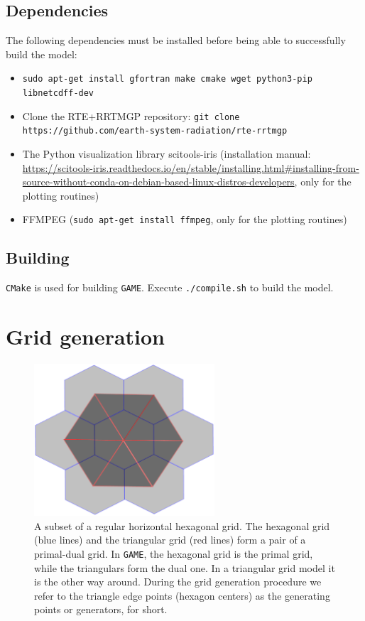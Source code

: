 \documentclass[10pt]{report}
\begin{document}
\section{Dependencies}
\label{sec:dependencies}

The following dependencies must be installed before being able to successfully build the model:

\begin{itemize}
\item \texttt{sudo apt-get install gfortran make cmake wget python3-pip libnetcdff-dev}
\item Clone the RTE+RRTMGP repository: \texttt{git clone https://github.com/earth-system-radiation/rte-rrtmgp}
\item The Python visualization library scitools-iris (installation manual: \url{https://scitools-iris.readthedocs.io/en/stable/installing.html#installing-from-source-without-conda-on-debian-based-linux-distros-developers}, only for the plotting routines)
\item FFMPEG (\texttt{sudo apt-get install ffmpeg}, only for the plotting routines)
\end{itemize}

\section{Building}
\label{sec:building}

\texttt{CMake} is used for building \texttt{GAME}. Execute \texttt{./compile.sh} to build the model.

\chapter{Grid generation}
\label{chap:grid_generation}

\begin{figure}
\begin{center}
\includegraphics[width = 0.6\textwidth]{hexagonal_grid_0.pdf}
\caption{A subset of a regular horizontal hexagonal grid. The hexagonal grid (blue lines) and the triangular grid (red lines) form a pair of a primal-dual grid. In \texttt{GAME}, the hexagonal grid is the primal grid, while the triangulars form the dual one. In a triangular grid model it is the other way around. During the grid generation procedure we refer to the triangle edge points (hexagon centers) as the generating points or generators, for short.}
\label{fig:hexagonal_grid_0}
\end{center}
\end{figure}
\end{document}
